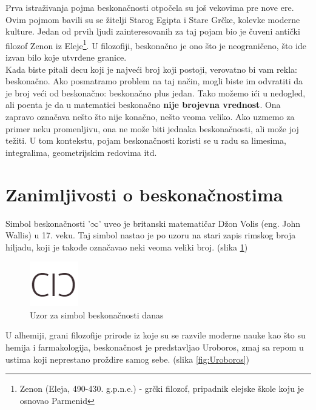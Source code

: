 \documentclass[a4paper]{article}
\begin{document}
Prva istraživanja pojma beskonačnosti otpočela su još vekovima pre nove ere. Ovim pojmom bavili su se žitelji Starog Egipta i Stare Grčke, kolevke moderne kulture. Jedan od prvih ljudi zainteresovanih za taj pojam bio je čuveni antički filozof Zenon iz Eleje\footnote{Zenon (Eleja, 490-430. g.p.n.e.) - grčki filozof, pripadnik elejske škole koju je osnovao Parmenid}. U filozofiji, beskonačno je ono što je neograničeno, što ide izvan bilo koje utvrđene granice\cite{weyl2013levels}.\\

Kada biste pitali decu koji je najveći broj koji postoji, verovatno bi vam rekla: beskonačno. Ako posmatramo problem na taj način, mogli biste im odvratiti da je broj veći od beskonačno: beskonačno plus jedan. Tako možemo ići u nedogled, ali poenta je da u matematici beskonačno \textbf{nije brojevna vrednost}. Ona zapravo označava nešto što nije konačno, nešto veoma veliko. Ako uzmemo za primer neku promenljivu, ona ne može biti jednaka beskonačnosti, ali može joj težiti. U tom kontekstu, pojam beskonačnosti koristi se u radu sa limesima, integralima, geometrijskim redovima itd.\\

\section{Zanimljivosti o beskonačnostima}

Simbol beskonačnosti '$\infty$' uveo je britanski matematičar Džon Volis (eng. John Wallis) u 17. veku. Taj simbol nastao je po uzoru na stari zapis rimskog broja hiljadu, koji je takođe označavao neki veoma veliki broj. (slika \ref{fig:Uzor za simbol beskonačnosti danas})\cite{beskonačno2016}
    
\begin{figure}[ht!]
\begin{center}
\includegraphics[scale=0.75]{Simbol.PNG}
\end{center}
\caption{Uzor za simbol beskonačnosti danas}
\label{fig:Uzor za simbol beskonačnosti danas}
\end{figure}
    
U alhemiji, grani filozofije prirode iz koje su se razvile moderne nauke kao što su hemija i farmakologija, beskonačnost je predstavljao Uroboros, zmaj sa repom u ustima koji neprestano proždire samog sebe. (slika \ref{fig:Uroboros})
    
\end{document}
